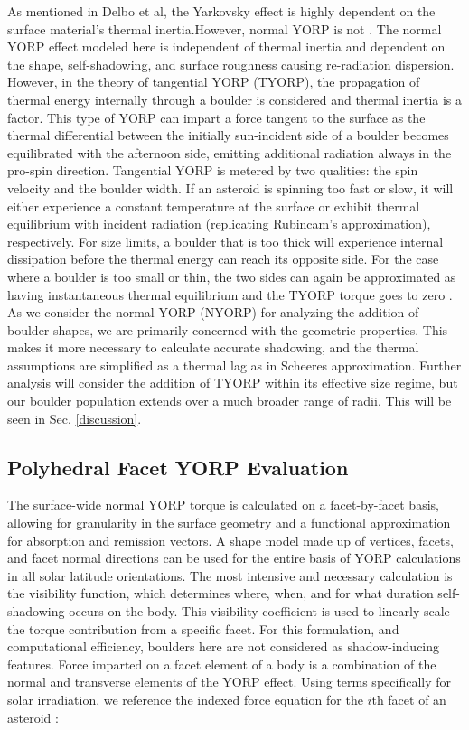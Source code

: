 As mentioned in Delbo et al, the Yarkovsky effect is highly dependent on the surface material's thermal inertia.However, normal YORP is not \citep{Delbo2015}. The normal YORP effect modeled here is independent of thermal inertia and dependent on the shape, self-shadowing, and surface roughness causing re-radiation dispersion. However, in the theory of tangential YORP (TYORP), the propagation of thermal energy internally through a boulder is considered and thermal inertia is a factor. This type of YORP can impart a force tangent to the surface as the thermal differential between the initially sun-incident side of a boulder becomes equilibrated with the afternoon side, emitting additional radiation always in the pro-spin direction. Tangential YORP is metered by two qualities: the spin velocity and the boulder width. If an asteroid is spinning too fast or slow, it will either experience a constant temperature at the surface or exhibit thermal equilibrium with incident radiation (replicating Rubincam's approximation), respectively. For size limits, a boulder that is too thick will experience internal dissipation before the thermal energy can reach its opposite side. For the case where a boulder is too small or thin, the two sides can again be approximated as having instantaneous thermal equilibrium and the TYORP torque goes to zero \citep{Golubov2012}. 
\\ \indent As we consider the normal YORP (NYORP) for analyzing the addition of boulder shapes, we are primarily concerned with the geometric properties. This makes it more necessary to calculate accurate shadowing, and the thermal assumptions are simplified as a thermal lag as in Scheeres approximation. Further analysis will consider the addition of TYORP within its effective size regime, but our boulder population extends over a much broader range of radii. This will be seen in Sec. \ref{discussion}. 

\subsection{Polyhedral Facet YORP Evaluation}\label{PFYORPE}

The surface-wide normal YORP torque is calculated on a facet-by-facet basis, allowing for granularity in the surface geometry and a functional approximation for absorption and remission vectors. A shape model made up of vertices, facets, and facet normal directions can be used for the entire basis of YORP calculations in all solar latitude orientations. The most intensive and necessary calculation is the visibility function, which determines where, when, and for what duration self-shadowing occurs on the body. This visibility coefficient is used to linearly scale the torque contribution from a specific facet. For this formulation, and computational efficiency, boulders here are not considered as shadow-inducing features. 
Force imparted on a facet element of a body is a combination of the normal and transverse elements of the YORP effect. Using terms specifically for solar irradiation, we reference the indexed force equation for the $i$th facet of an asteroid \citep{Scheeres2007}:

